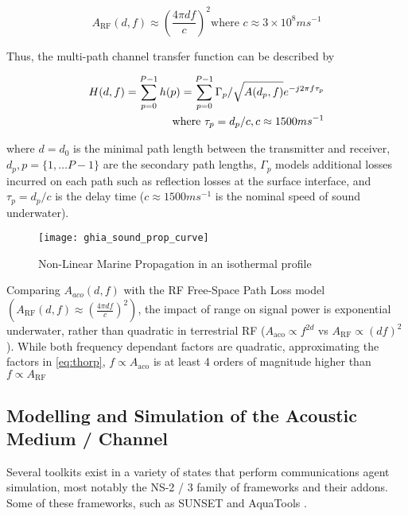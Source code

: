 \begin{equation}
  \label{eq:fspl}
  A_{\text{RF}}(d,f) \approx \left( \frac{4\pi d f}{c} \right)^2
  \text{where }c\approx 3\times10^8ms^{-1}
\end{equation}

Thus, the multi-path channel transfer function can be described by 

\begin{align}
  \label{eq:acomultipath}
  H(d,f) =\sum_{p=0}^{P-1} h(p) = \sum_{p=0}^{P-1} \Gamma_p / \sqrt{A(d_p,f)}e^{-j 2 \pi f \tau_p} \\
  \text{where } \tau_p = d_p/c, c \approx 1500 ms^{-1} \notag
\end{align}

where $d=d_0$ is the minimal path length between the transmitter and receiver, $d_p,p=\{1,\dots P-1\}$ are the secondary path lengths, $\Gamma_p$ models additional losses incurred on each path such as reflection losses at the surface interface, and $\tau_p = d_p/c$ is the delay time ($c \approx 1500 ms^{-1}$ is the nominal speed of sound underwater).

\begin{figure}
  \texttt{[image: ghia\_sound\_prop\_curve]}
  \caption{Non-Linear Marine Propagation in an isothermal profile}
  \label{fig:ghia_sound_prop_curve}
\end{figure}


Comparing $A_{aco}(d,f)$ with the RF Free-Space Path Loss model $(A_{\text{RF}}(d,f) \approx \left( \frac{4\pi d f}{c} \right)^2)$, the impact of range on signal power is exponential underwater, rather than quadratic in terrestrial RF ($A_{\text{aco}} \propto f^{2d}$ vs $A_{\text{RF}} \propto (df)^2$). 
While both frequency dependant factors are quadratic, approximating the factors in \eqref{eq:thorp}, $f\propto A_{\text{aco}}$ is at least 4 orders of magnitude higher than $f\propto A_{\text{RF}}$

\subsection{Modelling and Simulation of the Acoustic Medium / Channel}

Several toolkits exist in a variety of states that perform communications agent simulation, most notably the NS-2 / 3 family of frameworks and their addons.
Some of these frameworks, such as SUNSET \cite{Petrioli2012a} and AquaTools \cite{Senghal2010}.

